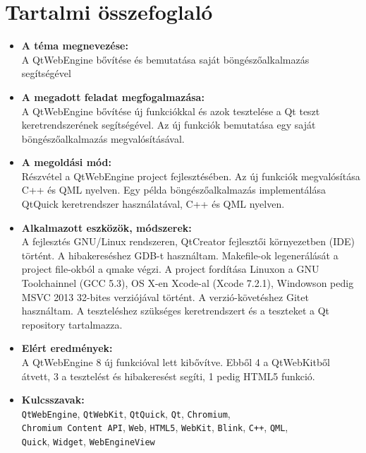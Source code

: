 \documentclass[12pt]{report}
\def\title{A QtWebEngine bővítése és bemutatása saját böngészőalkalmazás segítségével}
\begin{document}
\chapter*{Tartalmi összefoglaló}
\begin{itemize}
    \item \textbf{A téma megnevezése:} \\
        \title
    \item \textbf{A megadott feladat megfogalmazása:} \\
        A QtWebEngine bővítése új funkciókkal és azok tesztelése a
        Qt teszt keretrendszerének segítségével. Az új funkciók bemutatása
        egy saját böngészőalkalmazás megvalósításával.
    \item \textbf{A megoldási mód:} \\
        Részvétel a QtWebEngine project fejlesztésében. Az új funkciók
        megvalósítása C++ és QML nyelven. Egy példa böngészőalkalmazás implementálása
        QtQuick keretrendszer használatával, C++ és QML nyelven.
    \item \textbf{Alkalmazott eszközök, módszerek:} \\
        A fejlesztés GNU/Linux rendszeren, QtCreator fejlesztői
        környezetben (IDE) történt. A hibakereséshez GDB-t használtam.
        Makefile-ok legenerálását a project file-okból a qmake végzi.
        A project fordítása Linuxon a GNU Toolchainnel (GCC 5.3),
        OS X-en Xcode-al (Xcode 7.2.1), Windowson pedig
        MSVC 2013 32-bites verziójával történt. A verzió-követéshez Gitet
        használtam. A teszteléshez szükséges keretrendszert és a teszteket a Qt
        repository tartalmazza.
    \item \textbf{Elért eredmények:} \\
        A QtWebEngine 8 új funkcióval lett kibővítve. Ebből 4 a QtWebKitből
        átvett, 3 a tesztelést és hibakeresést segíti, 1 pedig HTML5 funkció.
    \item \textbf{Kulcsszavak:} \\
        \texttt{QtWebEngine}, \texttt{QtWebKit}, \texttt{QtQuick}, \texttt{Qt},
        \texttt{Chromium}, \\
        \texttt{Chromium Content API}, \texttt{Web}, \texttt{HTML5}, \texttt{WebKit},
        \texttt{Blink}, \texttt{C++}, \texttt{QML},\\
        \texttt{Quick}, \texttt{Widget}, \texttt{WebEngineView}
\end{itemize}
\end{document}
